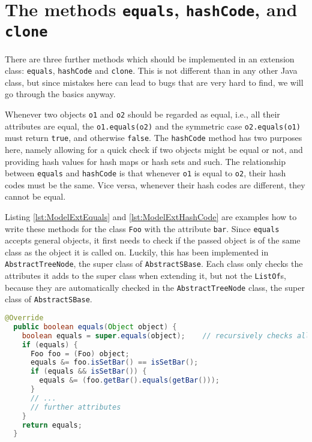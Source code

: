 \section{The methods \texttt{equals}, \texttt{hashCode}, and \texttt{clone}}

There are three further methods which should be implemented in an extension
class: \texttt{equals}, \texttt{hashCode} and \texttt{clone}.
This is not different than in any other Java class, but since mistakes here can
lead to bugs that are very hard to find, we will go through the basics anyway.

Whenever two objects \texttt{o1} and \texttt{o2} should be regarded as equal,
i.e., all their attributes are equal, the \texttt{o1.equals(o2)} and the
symmetric case \texttt{o2.equals(o1)} must return \texttt{true}, and otherwise
\texttt{false}. The \texttt{hashCode} method has two purposes here, namely
allowing for a quick check if two objects might be equal or not, and providing
hash values for hash maps or hash sets and such. The relationship between
\texttt{equals} and \texttt{hashCode} is that whenever \texttt{o1} is equal to
\texttt{o2}, their hash codes must be the same. Vice versa, whenever their hash
codes are different, they cannot be equal.

Listing \ref{lst:ModelExtEquals} and \ref{lst:ModelExtHashCode} are examples
how to write these methods for the class \texttt{Foo} with the attribute \texttt{bar}.
Since \texttt{equals} accepts general objects, it first needs to check if the
passed object is of the same class as the object it is called on.
Luckily, this has been implemented in \texttt{AbstractTreeNode}, the super
class of \texttt{AbstractSBase}. Each class only checks the attributes it adds
to the super class when extending it, but not the \texttt{ListOf}s, because
they are automatically checked in the \texttt{AbstractTreeNode} class, the
super class of \texttt{AbstractSBase}.

\begin{lstlisting}[language=Java,caption={Example of the \texttt{equals} method},label={lst:ModelExtEquals}]
  @Override
  public boolean equals(Object object) {
    boolean equals = super.equals(object);    // recursively checks all children
    if (equals) {
      Foo foo = (Foo) object;
      equals &= foo.isSetBar() == isSetBar();
      if (equals && isSetBar()) {
        equals &= (foo.getBar().equals(getBar()));
      }
      // ...
      // further attributes
    }
    return equals;
  }
\end{lstlisting}


